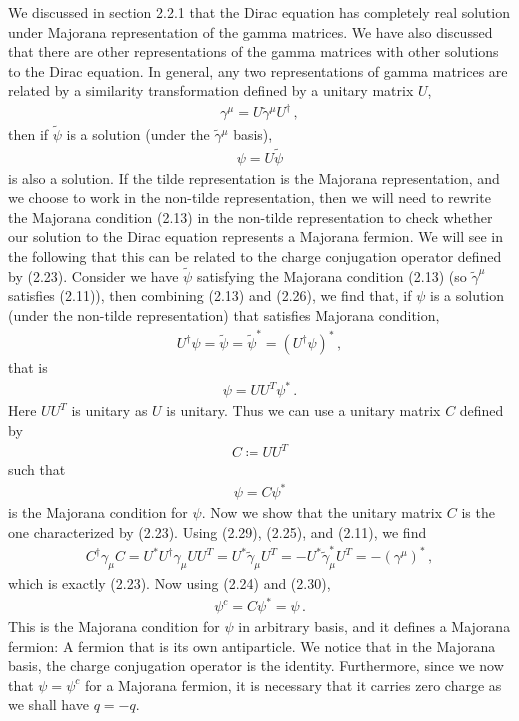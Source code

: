 \documentclass[11pt, oneside]{book}
\theoremstyle{break}
\theoremstyle{break}
\newcommand{\that}[1]{\widetilde{#1}}
\begin{document}
We discussed in section 2.2.1 that the Dirac equation has completely real solution under Majorana representation of the gamma matrices. We have also discussed that there are other representations of the gamma matrices with other solutions to the Dirac equation. In general, any two representations of gamma matrices are related by a similarity transformation defined by a unitary matrix $U$, 
\begin{align}
\gamma^\mu = U \that{\gamma}{}^\mu U^\dagger\,,
\end{align}
then if $\that{\psi}$ is a solution (under the $\that{\gamma}{}^\mu$ basis), 
\begin{align}
\psi = U \that{\psi}
\end{align}
is also a solution. If the tilde representation is the Majorana representation, and we choose to work in the non-tilde representation, then we will need to rewrite the Majorana condition (2.13) in the non-tilde representation to check whether our solution to the Dirac equation represents a Majorana fermion. We will see in the following that this can be related to the charge conjugation operator defined by (2.23). Consider we have $\that{\psi}$ satisfying the Majorana condition (2.13) (so $\that{\gamma}^\mu$ satisfies (2.11)), then combining (2.13) and (2.26), we find that, if $\psi$ is a solution (under the non-tilde representation) that satisfies Majorana condition,
\begin{align}
U^\dagger \psi = \that{\psi} = \that{\psi}^* = (U^\dagger \psi)^*\,,
\end{align}
that is 
\begin{align}
\psi = UU^T \psi^*\,.
\end{align}
Here $UU^T$ is unitary as $U$ is unitary. Thus we can use a unitary matrix $C$ defined by 
\begin{align}
C \coloneqq UU^T
\end{align}
such that 
\begin{align}
\psi = C \psi^*
\end{align}
is the Majorana condition for $\psi$. Now we show that the unitary matrix $C$ is the one characterized by (2.23). Using (2.29), (2.25), and (2.11), we find
\begin{align}
C^{\dagger}\gamma_\mu C = U^* U^\dagger  \gamma_\mu  UU^T =  U^* \that{\gamma}_\mu U^T =-U^* \that{\gamma}_\mu^* U^T = -(\gamma^\mu)^*  \,,
\end{align}
which is exactly (2.23). Now using (2.24) and (2.30),
\begin{align}
\psi^c = C{\psi}^* = \psi\,.
\end{align}
This is the Majorana condition for $\psi$ in arbitrary basis, and it defines a Majorana fermion: A fermion that is its own antiparticle. We notice that in the Majorana basis, the charge conjugation operator is the identity. Furthermore, since we now that $\psi = \psi^c$ for a Majorana fermion, it is necessary that it carries zero charge as we shall have $q= -q$.\\
\end{document}
